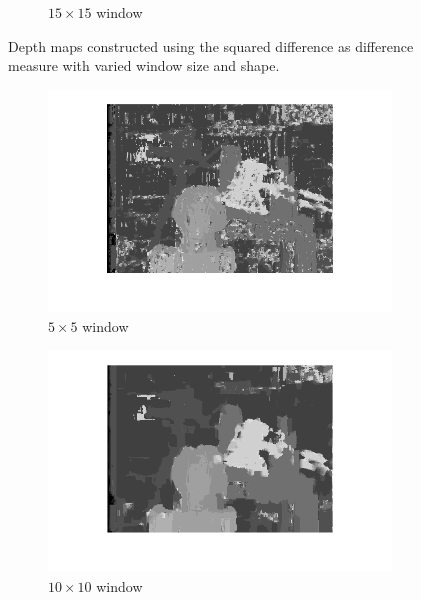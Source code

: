 \documentclass{article}
\begin{document}
\begin{figure}[ht!]
\begin{subfigure}{.3\textwidth}
  \caption{$15\times15$ window}
  \label{fig_s3g}
 \end{subfigure}
 \caption{Depth maps constructed using the squared difference as difference measure with varied window size and shape.}
 \label{fig_s}
\end{figure}



\begin{figure}[ht!]
 \centering
 \begin{subfigure}{.3\textwidth}
  \centering
  \includegraphics[width=\linewidth]{ex3/x5_5.png}
  \caption{$5\times5$ window}
  \label{fig_x1}
 \end{subfigure}
 \begin{subfigure}{.3\textwidth}
  \centering
  \includegraphics[width=\linewidth]{ex3/x10_10.png}
  \caption{$10\times10$ window}
  \label{fig_x2}
 \end{subfigure}
 \begin{subfigure}{.3\textwidth}

\end{subfigure}
\end{figure}
\end{document}
